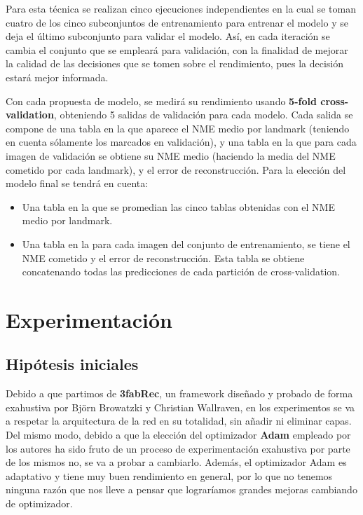         \medskip

        \noindent Para esta técnica se realizan cinco ejecuciones independientes en la cual se toman cuatro de los cinco subconjuntos de entrenamiento para entrenar el modelo y se deja el último subconjunto para validar el modelo. Así, en cada iteración se cambia el conjunto que se empleará para validación, con la finalidad de mejorar la calidad de las decisiones que se tomen sobre el rendimiento, pues la decisión estará mejor informada.

        \medskip

        \noindent Con cada propuesta de modelo, se medirá su rendimiento usando \textbf{5-fold cross-validation}, obteniendo 5 salidas de validación para cada modelo. Cada salida se compone de una tabla en la que aparece el NME medio por landmark (teniendo en cuenta sólamente los marcados en validación), y una tabla en la que para cada imagen de validación se obtiene su NME medio (haciendo la media del NME cometido por cada landmark), y el error de reconstrucción. Para la elección del modelo final se tendrá en cuenta: 

        \begin{itemize}
            \item Una tabla en la que se promedian las cinco tablas obtenidas con el NME medio por landmark.
            \item Una tabla en la para cada imagen del conjunto de entrenamiento, se tiene el NME cometido y el error de reconstrucción. Esta tabla se obtiene concatenando todas las predicciones de cada partición de cross-validation.
        \end{itemize}


\section{Experimentación}
    \subsection{Hipótesis iniciales}
        \noindent Debido a que partimos de \textbf{3fabRec}, un framework diseñado y probado de forma exahustiva por Björn Browatzki y Christian Wallraven, en los experimentos se va a respetar la arquitectura de la red en su totalidad, sin añadir ni eliminar capas. Del mismo modo, debido a que la elección del optimizador \textbf{Adam} empleado por los autores ha sido fruto de un proceso de experimentación exahustiva por parte de los mismos no, se va a probar a cambiarlo. Además, el optimizador Adam es adaptativo y tiene muy buen rendimiento en general, por lo que no tenemos ninguna razón que nos lleve a pensar que lograríamos grandes mejoras cambiando de optimizador.

